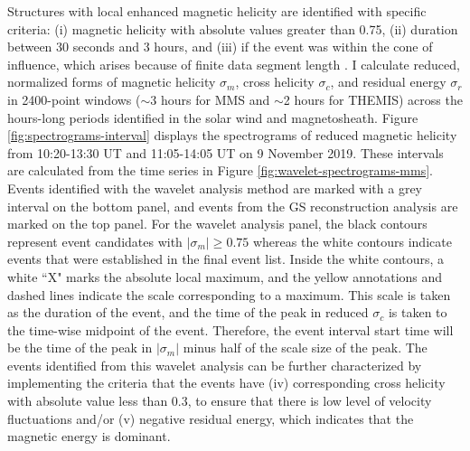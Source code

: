 Structures with local enhanced magnetic helicity are identified with specific criteria: (i) magnetic helicity with absolute values greater than 0.75, (ii) duration between 30 seconds and 3 hours, and (iii) if the event was within the cone of influence, which arises because of finite data segment length \citep{Torrence:1998}. I calculate reduced, normalized forms of magnetic helicity $\sigma_m$, cross helicity $\sigma_c$, and residual energy $\sigma_r$ in 2400-point windows ($\sim$3 hours for MMS and $\sim$2 hours for THEMIS) across the hours-long periods identified in the solar wind and magnetosheath. Figure \ref{fig:spectrograms-interval} displays the spectrograms of reduced magnetic helicity from 10:20-13:30 UT and 11:05-14:05 UT on 9 November 2019. These intervals are calculated from the time series in Figure \ref{fig:wavelet-spectrograms-mms}. Events identified with the wavelet analysis method are marked with a grey interval on the bottom panel, and events from the GS reconstruction analysis are marked on the top panel. For the wavelet analysis panel, the black contours represent event candidates with $|\sigma_m|\geq 0.75$ whereas the white contours indicate events that were established in the final event list. Inside the white contours, a white ``X" marks the absolute local maximum, and the yellow annotations and dashed lines indicate the scale corresponding to a maximum. This scale is taken as the duration of the event, and the time of the peak in reduced $\sigma_c$ is taken to the time-wise midpoint of the event. Therefore, the event interval start time will be the time of the peak in $|\sigma_m|$ minus half of the scale size of the peak. The events identified from this wavelet analysis can be further characterized by implementing the criteria that the events have (iv) corresponding cross helicity with absolute value less than 0.3, to ensure that there is low level of velocity fluctuations and/or (v) negative residual energy, which indicates that the magnetic energy is dominant.

